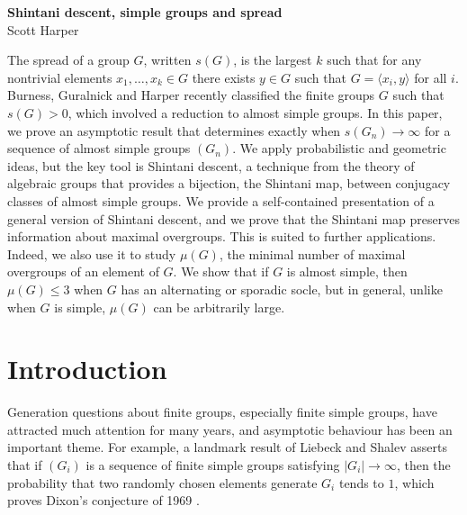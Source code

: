 \documentclass[11pt]{article}
\numberwithin{equation}{section}
\newcommand{\dateline}[1]{\enlargethispage{18pt}\blfootnote{\phantom{\Large M}\hspace{-1em}\emph{Date} #1}}
\theoremstyle{shdefinition}
\theoremstyle{shplain}
\newcommand{\<}{\langle}
\renewcommand{\>}{\rangle}
\renewcommand{\leq}{\leqslant}
\renewcommand{\:}{\colon}
\begin{document}
 
\begin{center} 
{\LARGE \textbf{Shintani descent, simple groups and spread}} \\[11pt]
{\Large Scott Harper}                                        \\[22pt]
\end{center}

\begin{center}
\begin{minipage}{0.8\textwidth}
\small The spread of a group $G$, written $s(G)$, is the largest $k$ such that for any nontrivial elements $x_1, \dots, x_k \in G$ there exists $y \in G$ such that $G = \< x_i, y \>$ for all $i$. Burness, Guralnick and Harper recently classified the finite groups $G$ such that $s(G) > 0$, which involved a reduction to almost simple groups. In this paper, we prove an asymptotic result that determines exactly when $s(G_n) \to \infty$ for a sequence of almost simple groups $(G_n)$. We apply probabilistic and geometric ideas, but the key tool is Shintani descent, a technique from the theory of algebraic groups that provides a bijection, the Shintani map, between conjugacy classes of almost simple groups. We provide a self-contained presentation of a general version of Shintani descent, and we prove that the Shintani map preserves information about maximal overgroups. This is suited to further applications. Indeed, we also use it to study $\mu(G)$, the minimal number of maximal overgroups of an element of $G$. We show that if $G$ is almost simple, then $\mu(G) \leq 3$ when $G$ has an alternating or sporadic socle, but in general, unlike when $G$ is simple, $\mu(G)$ can be arbitrarily large. \par
\end{minipage}
\end{center}

\dateline{\today}



\section{Introduction} \label{s:intro}

Generation questions about finite groups, especially finite simple groups, have attracted much attention for many years, and asymptotic behaviour has been an important theme. For example, a landmark result of Liebeck and Shalev \cite{ref:LiebeckShalev95} asserts that if $(G_i)$ is a sequence of finite simple groups satisfying $|G_i| \to \infty$, then the probability that two randomly chosen elements generate $G_i$ tends to $1$, which proves Dixon's conjecture of 1969 \cite{ref:Dixon69}.
\end{document}
